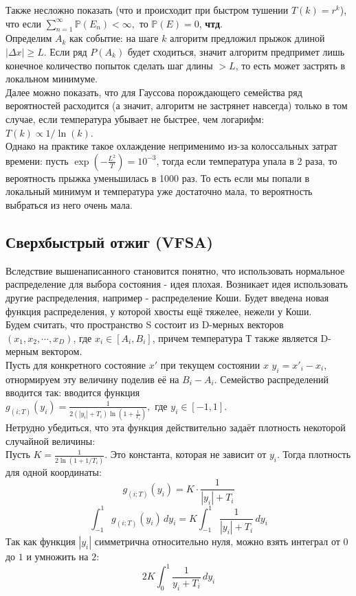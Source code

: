 Также несложно показать (что и происходит при быстром тушении $T(k)=r^k$), что если 
${\displaystyle \sum \limits _{n=1}^{\infty }\mathbb {P} \left(E_{n}\right)<\infty }, \text{ то }
{\displaystyle \mathbb {P} (E)=0}$, \textbf{чтд}. \\
Определим $A_k$ как событие: на шаге $k$ алгоритм предложил прыжок длиной $|\Delta x| \ge L$. Если ряд $P(A_k)$ будет сходиться, значит алгоритм предпримет лишь конечное количество попыток сделать шаг длины $> L$, то есть может застрять в локальном минимуме. \\
Далее можно показать, что для Гауссова порождающего семейства ряд вероятностей расходится (а значит, алгоритм не застрянет навсегда) только в том случае, если температура убывает не быстрее, чем логарифм: $T(k) \propto 1/\ln(k)$.  \\
Однако на практике такое охлаждение неприменимо из-за колоссальных затрат времени: пусть $\exp(-\frac{L^2}{T}) = 10^{-3}$, тогда если температура упала в 2 раза, то вероятность прыжка уменьшилась в 1000 раз. То есть если мы попали в локальный минимум и температура уже достаточно мала, то вероятность выбраться из него очень мала.
\subsection{Сверхбыстрый отжиг (VFSA)}
Вследствие вышенаписанного становится понятно, что использовать нормальное распределение для выбора состояния - идея плохая. Возникает идея использовать другие распределения, например - распределение Коши. Будет введена новая функция распределения, у которой хвосты ещё тяжелее, нежели у Коши.\\
Будем считать, что пространство S состоит из D-мерных векторов $(x_1, x_2, \cdots, x_D)$, где $x_i \in [A_i, B_i]$, причем температура Т также является D-мерным вектором. \\
Пусть для конкретного состояние $x'$ при текущем состоянии $x$ $y_i = x'_i - x_i$, отнормируем эту величину поделив её на $B_i - A_i$.
Семейство распределений вводится так: вводится функция \\
$\displaystyle g_{(i;T)}(y_i)=\frac{1}{2(|y_i|+T_i)\ln(1+\frac{1}{T_i})}, \text{ где}$ $y_i \in [-1, 1]$. \\
Нетрудно убедиться, что эта функция действительно задаёт плотность некоторой случайной величины: \\

Пусть $K = \frac{1}{2 \ln(1 + 1/T_i)}$. Это константа, которая не зависит от $y_i$.
Тогда плотность для одной координаты:
$$g_{(i;T)}(y_i) = K \cdot \frac{1}{|y_i| + T_i}$$
$$\int_{-1}^{1} g_{(i;T)}(y_i) \, dy_i = K \int_{-1}^{1} \frac{1}{|y_i| + T_i} \, dy_i$$
Так как функция $|y_i|$ симметрична относительно нуля, можно взять интеграл от $0$ до $1$ и умножить на $2$:
$$2K \int_{0}^{1} \frac{1}{y_i + T_i} \, dy_i$$

